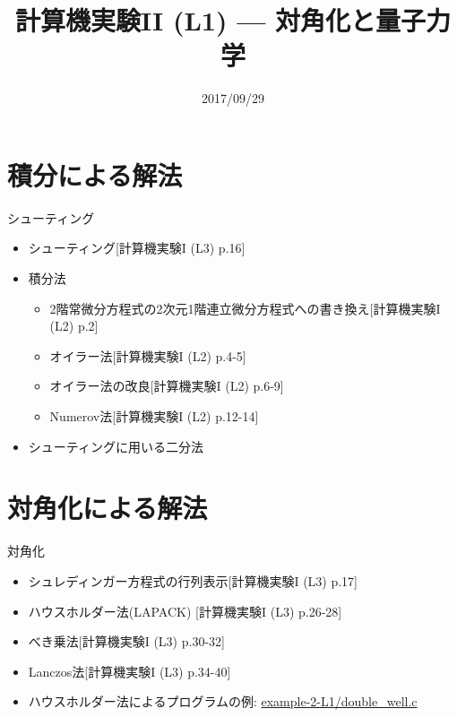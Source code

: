 \documentclass[dvipdfmx]{beamer}
\title{計算機実験II (L1) --- 対角化と量子力学}
\date{2017/09/29}
\begin{document}
\begin{frame}
  \titlepage
  \tableofcontents
\end{frame}




\section{積分による解法}

\begin{frame}[t,fragile]{シューティング}
  \begin{itemize}
    \setlength{\itemsep}{1em}
  \item シューティング[計算機実験I (L3) p.16]
  \item 積分法
    \begin{itemize}
    \item 2階常微分方程式の2次元1階連立微分方程式への書き換え[計算機実験I (L2) p.2]
    \item オイラー法[計算機実験I (L2) p.4-5]
    \item オイラー法の改良[計算機実験I (L2) p.6-9]
    \item Numerov法[計算機実験I (L2) p.12-14]
    \end{itemize}
  \item シューティングに用いる二分法
  \end{itemize}
\end{frame}



\section{対角化による解法}

\begin{frame}[t,fragile]{対角化}
  \begin{itemize}
    \setlength{\itemsep}{1em}
  \item シュレディンガー方程式の行列表示[計算機実験I (L3) p.17]
  \item ハウスホルダー法(LAPACK) [計算機実験I (L3) p.26-28]
  \item べき乗法[計算機実験I (L3) p.30-32]
  \item Lanczos法[計算機実験I (L3) p.34-40]
  \item ハウスホルダー法によるプログラムの例: \href{https://github.com/todo-group/computer-experiments/blob/master/exercise/eigenvalue_problem/double_well.c}{example-2-L1/double\_well.c}
  \end{itemize}
\end{frame}
\end{document}
